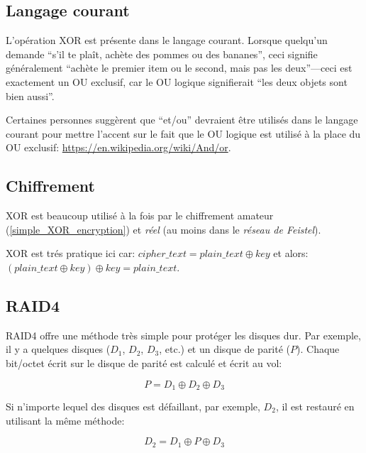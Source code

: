 ﻿
\label{XOR_property}



\subsection{Langage courant}

L'opération XOR est présente dans le langage courant.
Lorsque quelqu'un demande ``s'il te plaît, achète des pommes ou des bananes'', ceci
signifie généralement ``achète le premier item ou le second, mais pas les deux''---ceci
est exactement un OU exclusif, car le OU logique signifierait ``les deux objets sont bien aussi''.

Certaines personnes suggèrent que ``et/ou'' devraient être utilisés dans le langage
courant pour mettre l'accent sur le fait que le OU logique est utilisé à la place
du OU exclusif: \url{https://en.wikipedia.org/wiki/And/or}.

\subsection{Chiffrement}

XOR est beaucoup utilisé à la fois par le chiffrement amateur (\ref{simple_XOR_encryption})
et \emph{réel} (au moins dans le \emph{réseau de Feistel}).

XOR est trés pratique ici car:
$cipher\_text = plain\_text \oplus key$ et alors:
$(plain\_text \oplus key) \oplus key = plain\_text$.

\subsection{\ac{RAID}4}

\ac{RAID}4 offre une méthode très simple pour protéger les disques dur.
Par exemple, il y a quelques disques ($D_1$, $D_2$, $D_3$, etc.) et un disque de
parité ($P$).
Chaque bit/octet écrit sur le disque de parité est calculé et écrit au vol:

\begin{equation} \label{eq:RAID4}
P = D_1 \oplus D_2 \oplus D_3
\end{equation}

Si n'importe lequel des disques est défaillant, par exemple, $D_2$, il est restauré
en utilisant la même méthode:

\begin{equation}
D_2 = D_1 \oplus P \oplus D_3
\end{equation}

